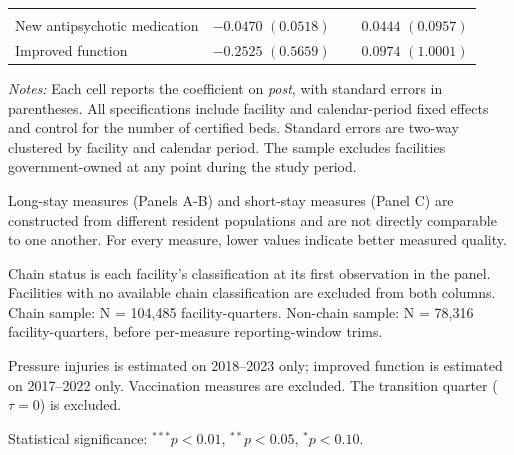 \begin{table}[!ht]
\begin{threeparttable}
\begin{tabularx}{\textwidth}{@{} l Y Y @{}}
\addlinespace[0.6em]
 \\[2pt]
New antipsychotic medication &  &  \\
Improved function &  &  \\
\bottomrule
\end{tabularx}

\begin{tablenotes}[flushleft]
\footnotesize
\item \textit{Notes:} Each cell reports the coefficient on \textit{post}, with standard errors in parentheses. All specifications include facility and calendar-period fixed effects and control for the number of certified beds. Standard errors are two-way clustered by facility and calendar period. The sample excludes facilities government-owned at any point during the study period.
\item Long-stay measures (Panels A-B) and short-stay measures (Panel C) are constructed from different resident populations and are not directly comparable to one another. For every measure, lower values indicate better measured quality.
\item Chain status is each facility's classification at its first observation in the panel. Facilities with no available chain classification are excluded from both columns. Chain sample: N = 104,485 facility-quarters. Non-chain sample: N = 78,316 facility-quarters, before per-measure reporting-window trims.
\item Pressure injuries is estimated on 2018--2023 only; improved function is estimated on 2017--2022 only. Vaccination measures are excluded. The transition quarter ($\tau = 0$) is excluded.
\item Statistical significance: $^{***}p<0.01$, $^{**}p<0.05$, $^{*}p<0.10$.
\end{tablenotes}

\end{threeparttable}
\end{table}
